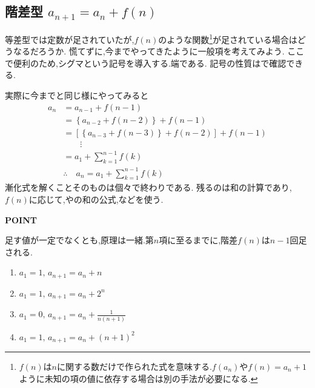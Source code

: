 
\subsection{\texorpdfstring{階差型  $a_{n+1}=a_n+f(n)$}{階差型}}\label{節：階差型}

等差型では定数が足されていたが,$f(n)$のような関数\footnote{$f(n)$は$n$に関する数だけで作られた式を意味する.$f(a_n)$や$f(n)=a_n+1$ように未知の項の値に依存する場合は別の手法が必要になる.}が足されている場合はどうなるだろうか.
慌てずに,今までやってきたように一般項を考えてみよう.
ここで便利のため,シグマという記号を導入する.端である.
記号の性質はで確認できる.

実際に今までと同じ様にやってみると
\begin{align*}
  a_{n}&=a_{n-1}+f(n-1)\\
  &=\left\{a_{n-2}+f(n-2)\right\}+f(n-1)\\
  &=\left[\left\{a_{n-3}+f(n-3)\right\}+f(n-2)\right]+f(n-1)\\
  &\qquad \vdots\\
  &=a_1+\sum_{k=1}^{n-1} f(k)\\
  &\therefore \quad a_n=a_1+\sum_{k=1}^{n-1} f(k)
\end{align*}
漸化式を解くことそのものは個々で終わりである.
残るのは和の計算であり,$f(n)$に応じて,やの和の公式,などを使う.

\begin{bookpoint}
  \textbf{POINT}\par
  足す値が一定でなくとも,原理は一緒.第$n$項に至るまでに,階差$f(n)$は$n-1$回足される.
\end{bookpoint}

\noindent {}\par\nobreak
\begin{enumerate}[label=(\arabic*),parsep=3pt,format=\bookitemlink{example-difference-1}{problem}{answer}]
  \item $\displaystyle a_1=1,\, a_{n+1}=a_n+n$
  \item $\displaystyle a_1=1,\, a_{n+1}=a_n+2^n$
  \item $\displaystyle a_1=0,\, a_{n+1}=a_n+\frac{1}{n(n+1)}$
  \item $\displaystyle a_1=1,\, a_{n+1}=a_n+(n+1)^2$
\end{enumerate}

